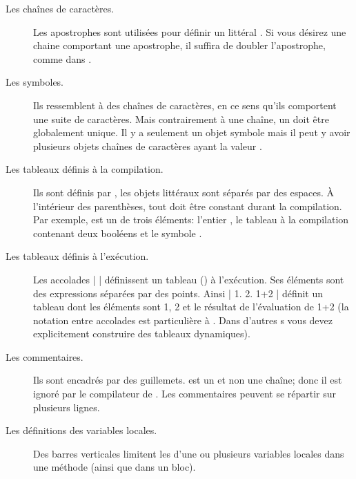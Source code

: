 \documentclass[a4paper,10pt,twoside]{book}
\begin{document}
\begin{description}
\item[Les chaînes de caract\`{e}res.] Les apostrophes sont utilis\'{e}es pour d\'{e}finir un  litt\'{e}ral .
Si vous d\'{e}sirez une chaine comportant une apostrophe, il suffira de doubler l'apostrophe, comme dans .

\item[Les symboles.] Ils ressemblent \`a des chaînes de caract\`{e}res, en ce sens qu'ils comportent une suite de caract\`{e}res.  
Mais contrairement \`{a} une chaîne, un  doit \^{e}tre globalement unique.
Il y a seulement un objet symbole  mais il peut y avoir plusieurs objets chaînes de caract\`{e}res ayant la valeur .

\item[Les tableaux définis \`{a} la compilation.] Ils sont d\'{e}finis par \ct{#( )}, les objets litt\'{e}raux sont s\'{e}par\'{e}s par des espaces.
À l'int\'{e}rieur des parenth\`{e}ses, tout doit \^{e}tre constant durant la compilation.
Par exemple,   est un
  de trois \'{e}l\'{e}ments: l'entier , le tableau \`{a} la compilation contenant deux bool\'{e}ens et le symbole .

\item[Les tableaux définis \`{a} l'ex\'{e}cution.] Les accolades \ct|{ }|
  d\'{e}finissent un tableau () \`{a} l'ex\'{e}cution.
Ses \'{e}l\'{e}ments sont des expressions s\'epar\'{e}es par des points.
Ainsi \ct|{ 1. 2. 1+2 }| d\'{e}finit un tableau dont les \'{e}l\'{e}ments sont 1, 2 et le r\'{e}sultat de l'\'{e}valuation de 1+2
(la notation entre accolades est particuli\`{e}re \`{a} \sq.
Dans d'autres \st{}s vous devez explicitement construire des tableaux dynamiques).

\item[Les commentaires.] Ils sont encadr\'{e}s par des guillemets.
 est un  et non une
chaîne; donc il est ignor\'{e} par le compilateur de \sq.
Les commentaires peuvent se r\'{e}partir sur plusieurs lignes.
		
\item[Les d\'{e}finitions des variables locales.] Des barres
  verticales \ct{| |} limitent les
   d'une ou plusieurs variables
  locales dans une m\'{e}thode (ainsi que dans un bloc).


\end{description}
\end{document}
